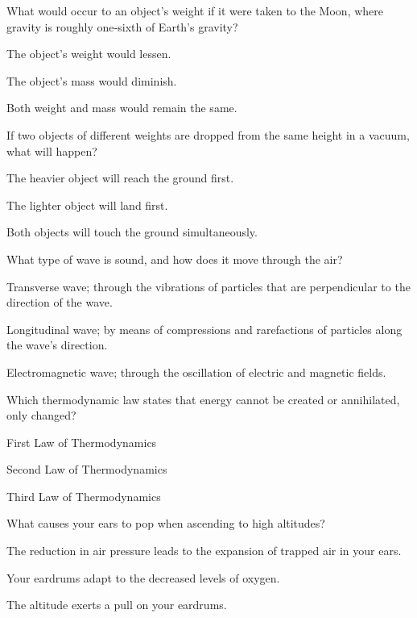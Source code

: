 \begin{enhancedmcq}{What would occur to an object's weight if it were taken to the Moon, where gravity is roughly one‑sixth of Earth's gravity?}
\item The object's weight would lessen.
\item The object's mass would diminish.
\item Both weight and mass would remain the same.

\end{enhancedmcq}
\begin{enhancedmcq}{If two objects of different weights are dropped from the same height in a vacuum, what will happen?}
\item The heavier object will reach the ground first.
\item The lighter object will land first.
\item Both objects will touch the ground simultaneously.

\end{enhancedmcq}
\begin{enhancedmcq}{What type of wave is sound, and how does it move through the air?}
\item Transverse wave; through the vibrations of particles that are perpendicular to the direction of the wave.
\item Longitudinal wave; by means of compressions and rarefactions of particles along the wave's direction.
\item Electromagnetic wave; through the oscillation of electric and magnetic fields.

\end{enhancedmcq}
\begin{enhancedmcq}{Which thermodynamic law states that energy cannot be created or annihilated, only changed?}
\item First Law of Thermodynamics
\item Second Law of Thermodynamics
\item Third Law of Thermodynamics

\end{enhancedmcq}
\begin{enhancedmcq}{What causes your ears to pop when ascending to high altitudes?}
\item The reduction in air pressure leads to the expansion of trapped air in your ears.
\item Your eardrums adapt to the decreased levels of oxygen.
\item The altitude exerts a pull on your eardrums.

\end{enhancedmcq}
